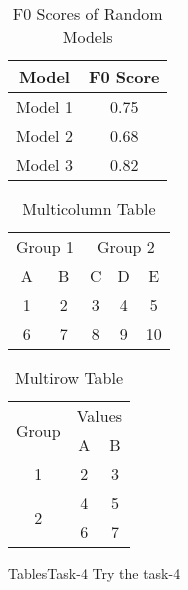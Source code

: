 \begin{frame}
\begin{table}[htbp]
\centering
\caption{F0 Scores of Random Models}
\begin{tabular}{cc}
\toprule
Model & F0 Score \\
\midrule
Model 1 & 0.75 \\
Model 2 & 0.68 \\
Model 3 & 0.82 \\
\bottomrule
\end{tabular}
\end{table}
\end{frame}

\begin{frame}
\begin{table}[htbp]
\centering
\caption{Multicolumn Table}
\begin{tabular}{ccccc}
\toprule
\multicolumn{2}{c}{Group 1} & \multicolumn{3}{c}{Group 2} \\
\cmidrule(r){1-2} \cmidrule(l){3-5}
A & B & C & D & E \\
\midrule
1 & 2 & 3 & 4 & 5 \\
6 & 7 & 8 & 9 & 10 \\
\bottomrule
\end{tabular}
\end{table}
\end{frame}

\begin{table}[htbp]
\centering
\caption{Multirow Table}
\begin{tabular}{ccc}
\toprule
\multirow{2}{*}{Group} & \multicolumn{2}{c}{Values} \\
\cmidrule(r){2-3}
 & A & B \\
\midrule
1 & 2 & 3 \\
\midrule
\multirow{2}{*}{2} & \multicolumn{1}{c}{4} & \multicolumn{1}{c}{5} \\
 & 6 & 7 \\
\bottomrule
\end{tabular}
\end{table}
\begin{frame}

\end{frame}
\begin{frame}{Tables}{Task-4}
    Try the task-4
\end{frame}
